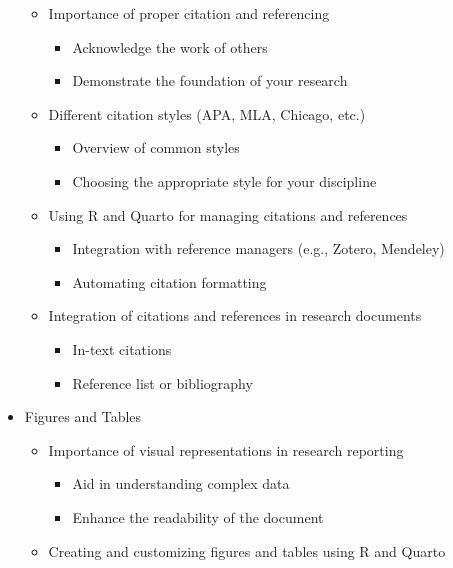 \documentclass[
  letterpaper,
  DIV=11,
  numbers=noendperiod]{scrreprt}
\providecommand{\tightlist}{%
  \setlength{\itemsep}{0pt}\setlength{\parskip}{0pt}}\usepackage{longtable,booktabs,array}
\theoremstyle{definition}
\theoremstyle{remark}
\begin{document}
\begin{itemize}
  \begin{itemize}
  \tightlist
  \item
    Importance of proper citation and referencing

    \begin{itemize}
    \tightlist
    \item
      Acknowledge the work of others
    \item
      Demonstrate the foundation of your research
    \end{itemize}
  \item
    Different citation styles (APA, MLA, Chicago, etc.)

    \begin{itemize}
    \tightlist
    \item
      Overview of common styles
    \item
      Choosing the appropriate style for your discipline
    \end{itemize}
  \item
    Using R and Quarto for managing citations and references

    \begin{itemize}
    \tightlist
    \item
      Integration with reference managers (e.g., Zotero, Mendeley)
    \item
      Automating citation formatting
    \end{itemize}
  \item
    Integration of citations and references in research documents

    \begin{itemize}
    \tightlist
    \item
      In-text citations
    \item
      Reference list or bibliography
    \end{itemize}
  \end{itemize}
\item
  Figures and Tables

  \begin{itemize}
  \tightlist
  \item
    Importance of visual representations in research reporting

    \begin{itemize}
    \tightlist
    \item
      Aid in understanding complex data
    \item
      Enhance the readability of the document
    \end{itemize}
  \item
    Creating and customizing figures and tables using R and Quarto


\end{itemize}
\end{itemize}
\end{document}
